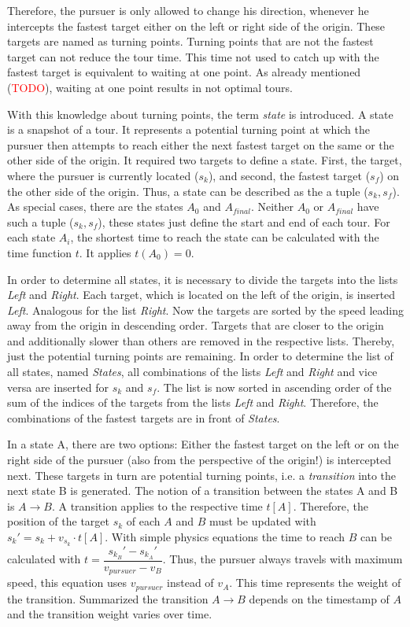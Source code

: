 \documentclass[english,version-2019-07]{uzl-thesis}
\begin{document}
Therefore, the pursuer is only allowed to change his direction, whenever he intercepts the fastest target either on the left or right side of the origin. These targets are named as turning points. Turning points that are not the fastest target can not reduce the tour time. This time not used to catch up with the fastest target is equivalent to waiting at one point. As already mentioned (\textcolor{red}{TODO}), waiting at one point results in not optimal tours. 

With this knowledge about turning points, the term \emph{state} is introduced. A state is a snapshot of a tour. It represents a potential turning point at which the pursuer then attempts to reach either the next fastest target on the same or the other side of the origin. It required two targets to define a state. First, the target, where the pursuer is currently located ($s_k$), and second, the fastest target ($s_f$) on the other side of the origin. Thus, a state can be described as the a tuple ($s_k, s_f$). As special cases, there are the states $A_0$ and $A_{final}$. Neither $A_0$ or $A_{final}$ have such a tuple ($s_k, s_f$), these states just define the start and end of each tour. For each state $A_i$, the shortest time to reach the state can be calculated with the time function $t$. It applies $t(A_0) = 0$.

In order to determine all states, it is necessary to divide the targets into the lists \emph{Left} and \emph{Right}. Each target, which is located on the left of the origin, is inserted \emph{Left}. Analogous for the list \emph{Right}. Now the targets are sorted by the speed leading away from the origin in descending order. Targets that are closer to the origin and additionally slower than others are removed in the respective lists. Thereby, just the potential turning points are remaining. In order to determine the list of all states, named \emph{States}, all combinations of the lists \emph{Left} and \emph{Right} and vice versa are inserted for $s_k$ and $s_f$. The list is now sorted in ascending order of the sum of the indices of the targets from the lists \emph{Left} and \emph{Right}. Therefore, the combinations of the fastest targets are in front of \emph{States}. 

In a state A, there are two options: Either the fastest target on the left or on the right side of the pursuer (also from the perspective of the origin!) is intercepted next. These targets in turn are potential turning points, i.e. a \emph{transition} into the next state B is generated. The notion of a transition between the states A and B is $A\rightarrow B$. A transition applies to the respective time $t[A]$. Therefore, the position of the target $s_k$ of each $A$ and $B$ must be updated with $s_k'= s_k + v_{s_k} \cdot t[A]$. With simple physics equations the time to reach $B$ can be calculated with $t = \dfrac{s_{k_{B}}' - s_{k_{A}}'}{v_{pursuer} - v_{B}}$. Thus, the pursuer always travels with maximum speed, this equation uses $v_{pursuer}$ instead of $v_{A}$. This time represents the weight of the transition. Summarized the transition $A\rightarrow B$ depends on the timestamp of $A$ and the transition weight varies over time. 
\end{document}
